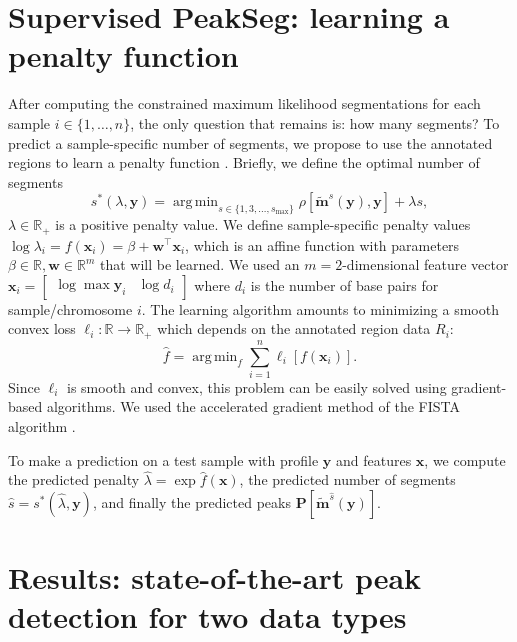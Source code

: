 \documentclass{article}
\DeclareMathOperator*{\argmin}{arg\,min}
\newcommand{\RR}{\mathbb R}
\begin{document}
\section{Supervised PeakSeg: learning a penalty function}
\label{sec:supervised}

After computing the constrained maximum likelihood segmentations for
each sample $i\in\{1,\dots, n\}$, the only question that remains is:
how many segments? To predict a sample-specific number of segments, we
propose to use the annotated regions to learn a penalty function
\citep{HOCKING-penalties}. Briefly, we define the optimal number of
segments 
\begin{equation}
  s^*(\lambda, \mathbf y) = 
  \argmin_{s\in\{1,3,\dots, s_{\text{max}}\}}
  \rho\left[
    \mathbf{\tilde m}^s(\mathbf y),
    \mathbf y
  \right]
  + \lambda s,
\end{equation}
$\lambda\in\RR_+$ is a positive
penalty value. We define sample-specific penalty values $\log
\lambda_i = f(\mathbf x_i) = \beta + \mathbf w^\intercal \mathbf x_i$,
which is an affine function with parameters $\beta\in\RR,\mathbf
w\in\RR^m$ that will be learned. We used an $m=2$-dimensional feature vector
$\mathbf x_i = \left[\begin{array}{cc} \log\max \mathbf y_i & \log d_i
\end{array}\right]$ where $d_i$ is the number of base pairs for 
sample/chromosome $i$. The learning algorithm amounts to minimizing a
smooth convex loss $\ell_i:\RR\rightarrow\RR_+$ which depends on the
annotated region data $R_i$:
\begin{equation}
  \label{eq:relax}
  \hat f = \argmin_f \sum_{i=1}^n
  \ell_i\left[ f(\mathbf x_i) \right].
\end{equation}
Since $\ell_i$ is smooth and convex, this problem can be easily solved
using gradient-based algorithms. We used the accelerated gradient
method of the FISTA algorithm \citep{fista}.

To make a prediction on a
test sample with profile $\mathbf y$ and features $\mathbf x$, we
compute the predicted penalty $\hat \lambda = \exp \hat f(\mathbf x)$,
the predicted number of segments $\hat s = s^*(\hat \lambda, \mathbf
y)$, and finally the predicted peaks $\mathbf P\left[ \mathbf{\tilde
    m}^{\hat s}(\mathbf y) \right]$.

\section{Results: state-of-the-art peak detection for two data types}
\end{document}
